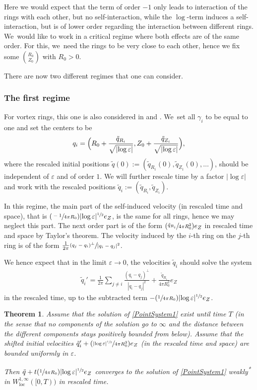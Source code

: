 \documentclass[JEP,XML,SOM,Unicode,published]{cedram}
\let\epsilon\varepsilon
\newcommand{\Psfrac}[2]{(\sfrac{#1}{#2})}
\newcommand{\loc}{\mathrm{loc}}
\newtheorem{theorem}{Theorem}[subsection]
\theoremstyle{definition}
\renewcommand\star{\textsuperscript{*} }
\newcommand\eq{=}
\let\eps\epsilon
\begin{document}
Here we would expect that the term of order $-1$ only leads to interaction of the rings with each other, but no self-interaction, while the $\log$-term induces a self-interaction, but is of lower order regarding the interaction between different rings. We~would like to work in a critical regime where both effects are of the same order. For this, we~need the rings to be very close to each other, hence we fix some $\binom{R_0}{Z_0}$ with $R_0>0$.

There are now two different regimes that one can consider.

\subsubsection{The first regime}

For vortex rings, this one is also considered in \cite{Davila2022leapfrogging} and \cite{JerrardSmets}. We~set all $\gamma_i$ to be equal to one and set the centers to be
\begin{align}\label{def regime1}
q_i\eq\Bigl(R_0+\frac{\tilde{q}_{R_i}}{\sqrt{|{\log\eps}|}},Z_0+\frac{\tilde{q}_{Z_i}}{\sqrt{|{\log\eps}|}}\Bigr),
\end{align}
where the rescaled initial positions $\tilde{q}(0):=(\tilde{q}_{R_1}(0),\tilde{q}_{Z_1}(0),\dots)$, should be independent of $\eps$ and of order $1$.
We will further rescale time by a factor $|{\log\eps}|$ and work with the rescaled positions $\tilde{q}_i:=(\tilde{q}_{R_i},\tilde{q}_{Z_i})$.

In this regime, the main part of the self-induced velocity (in rescaled time and space), that is $\Psfrac{-1}{4\pi R_0}|{\log\eps}|^{\sfrac{1}{2}}e_Z$, is the same for all rings, hence we may neglect this part. The next order part is of the form $\Psfrac{\tilde{q}_{R_i}}{4\pi R_0^2}e_Z$ in rescaled time and space by Taylor's theorem.
The velocity induced by the $i$-th ring on the $j$-th ring is of the form $\frac{1}{2\pi}\sfrac{(q_j-q_i)^\perp}{|q_i-q_j|^2}$.

We hence expect that in the limit $\eps\to 0$, the velocities $\tilde{q}_i$ should solve the system
\begin{align}\label{PointSystem1}
\tilde{q}_i'\eq\frac{1}{2\pi}\sum_{j\neq i}\frac{(q_i-q_j)^\perp}{|q_i-q_j|^2}+\frac{\tilde{q}_{R_i}}{4\pi R_0^2}e_Z
\end{align}
in the rescaled time, up to the subtracted term $-\Psfrac{1}{4\pi R_0}|{\log\eps}|^{\sfrac{1}{2}}e_Z$.

\begin{theorem}\label{Limit1}
Assume that the solution of \eqref{PointSystem1} exist until time $T$ (in the sense that no components of the solution go to $\infty$ and the distance between the different components stays positively bounded from below).
Assume that the shifted initial velocities $\tilde{q}_i'+\Psfrac{|{\log\eps}|^{\sfrac{1}{2}}}{4\pi R_0^2}e_Z$ (in the rescaled time and space) are bounded uniformly in $\eps$.

Then $\tilde{q}+t\Psfrac{1}{4\pi R_0}|{\log\eps}|^{\sfrac{1}{2}}e_Z$ converges to the solution of \eqref{PointSystem1} weakly\star in $W_{\loc}^{1,\infty}([0,T))$ in rescaled time.
\end{theorem}
\end{document}

